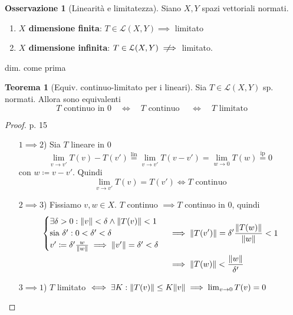 \documentclass[a4paper,10pt]{article}
\theoremstyle{definition}
\newcommand{\notimplies}{\mathrel{{\ooalign{\hidewidth$\not\phantom{=}$\hidewidth\cr$\implies$}}}}  %
\theoremstyle{indentdefinition}
\theoremstyle{indenttheorem}
\newtheorem{thm}{Teorema}
\theoremstyle{myremark}
\newtheorem*{rem*}{Osservazione}
\theoremstyle{indentgeneral}
\newenvironment{myboxed} 
{\noindent\begin{lrbox}{\mybox}\begin{minipage}{\textwidth}}
{\end{minipage}\end{lrbox}\fbox{\usebox{\mybox}}}
\begin{document}
\begin{rem*}[Linearità e limitatezza] Siano $X,Y$ spazi vettoriali normati.
\begin{enumerate}
    \item \textbf{$X$ dimensione finita}: $T\in\mathcal{L}(X,Y)\implies$ limitato
     \item \textbf{$X$ dimensione infinita}: $T\in\mathcal{L}(X,Y)\notimplies$ limitato. 
\end{enumerate}
dim. come prima
\end{rem*}

\begin{myboxed}
    \begin{thm}[Equiv. continuo-limitato per i lineari] \label{thm-equiv-continuo-limitato}
        Sia  $T\in\mathcal{L}(X,Y)$ sp. normati. Allora sono equivalenti
        $$T \text{ continuo in 0}\quad \iff \quad T \text{ continuo }\quad \iff \quad T \text{ limitato }$$
    \end{thm}
\end{myboxed}
\begin{proof}p. 15
    \begin{itemize}
        \item[$1\implies 2$)] Sia $T$ lineare in 0
        $$\lim_{v\to v'}T(v)-T(v')\overset{\text{lin}}{=}\lim_{v\to v'}T(v-v')=\lim_{w\to0}T(w)\overset{\text{ip}}{=}0$$
        con $w\coloneqq v-v'$. Quindi
        $$\lim_{v\to v'}T(v)=T(v')\iff T\text{ continuo}$$
        \item[$2\implies 3$)] Fissiamo $v,w\in X$. $T$ continuo $\implies T$ continuo in 0, quindi
        \begin{align*}
            \begin{cases}
                \exists \delta>0: \norm{v}< \delta \land \norm{T(v)}<1\\
                \text{sia }\delta': 0<\delta'<\delta \\
                v'\coloneqq \delta'\frac{w}{\norm{w}}\implies\norm{v'}=\delta'<\delta
            \end{cases}&\implies\norm{T(v')}=\delta'\frac{\norm{T(w)}}{\norm{w}}<1\\
            &\implies\norm{T(w)}<\frac{\norm{w}}{\delta'}
        \end{align*}
        \item[$3\implies 1$)] $T$ limitato $\iff\exists K: \norm{T(v)}\le K\norm{v}\implies\lim_{v\to 0}T(v)=0$
    \end{itemize}
\end{proof}
\end{document}
